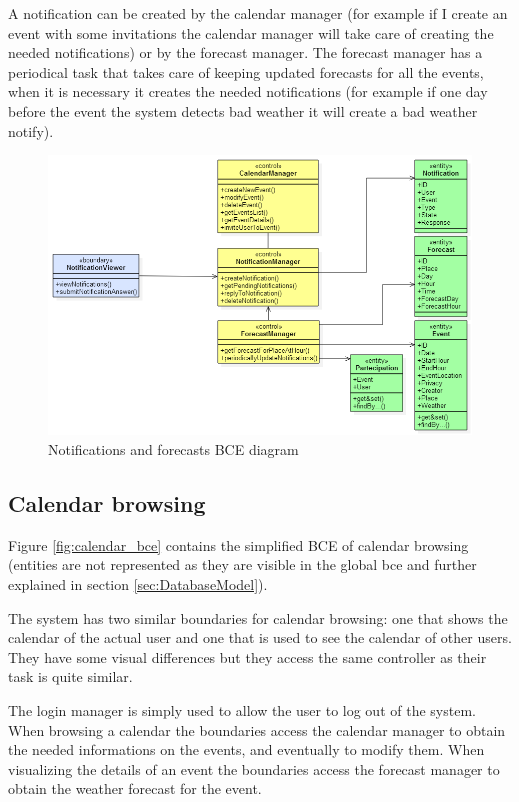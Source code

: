 \documentclass[10pt,a4paper,titlepage]{article}
\begin{document}
A notification can be created by the calendar manager (for example if I create an event with some invitations the calendar manager will take care of creating the needed notifications) or by the forecast manager. The forecast manager has a periodical task that takes care of keeping updated forecasts for all the events, when it is necessary it creates the needed notifications (for example if one day before the event the system detects bad weather it will create a bad weather notify).
\begin{figure}[h]
\centering
\includegraphics[width=\linewidth]{./bce/notification_bce}
\caption[notification bce]{Notifications and forecasts BCE diagram}
\label{fig:notification_bce}
\end{figure}

\subsection{Calendar browsing}
Figure \ref{fig:calendar_bce} contains the simplified BCE of calendar browsing (entities are not represented as they are visible in the global bce and further explained in section \ref{sec:DatabaseModel}).

The system has two similar boundaries for calendar browsing: one that shows the calendar of the actual user and one that is used to see the calendar of other users. They have some visual differences but they access the same controller as their task is quite similar.

The login manager is simply used to allow the user to log out of the system.
When browsing a calendar the boundaries access the calendar manager to obtain the needed informations on the events, and eventually to modify them.
When visualizing the details of an event the boundaries access the forecast manager to obtain the weather forecast for the event.
\end{document}
